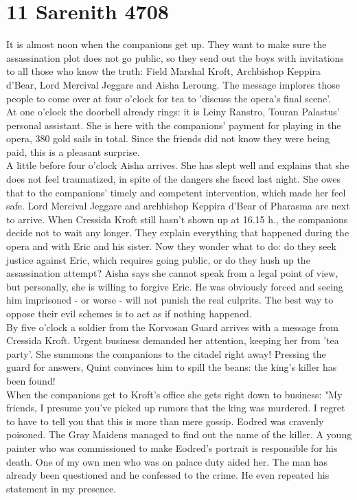 \section{11 Sarenith 4708}

It is almost noon when the companions get up. They want to make sure the assassination plot does not go public, so they send out the boys with invitations to all those who know the truth: Field Marshal Kroft, Archbishop Keppira d'Bear, Lord Mercival Jeggare and Aisha Leroung. The message implores those people to come over at four o'clock for tea to 'discuss the opera's final scene'.\\

At one o'clock the doorbell already rings: it is Leiny Ranstro, Touran Palastus' personal assistant. She is here with the companions' payment for playing in the opera, 380 gold sails in total. Since the friends did not know they were being paid, this is a pleasant surprise.\\

A little before four o'clock Aisha arrives. She has slept well and explains that she does not feel traumatized, in spite of the dangers she faced last night. She owes that to the companions' timely and competent intervention, which made her feel safe. Lord Mercival Jeggare and archbishop Keppira d'Bear of Pharasma are next to arrive. When Cressida Kroft still hasn't shown up at 16.15 h., the companions decide not to wait any longer. They explain everything that happened during the opera and with Eric and his sister. Now they wonder what to do: do they seek justice against Eric, which requires going public, or do they hush up the assassination attempt? Aisha says she cannot speak from a legal point of view, but personally, she is willing to forgive Eric. He was obviously forced and seeing him imprisoned - or worse - will not punish the real culprits. The best way to oppose their evil schemes is to act as if nothing happened.\\

By five o'clock a soldier from the Korvosan Guard arrives with a message from Cressida Kroft. Urgent business demanded her attention, keeping her from 'tea party'. She summons the companions to the citadel right away! Pressing the guard for answers, Quint convinces him to spill the beans: the king's killer has been found!\\

When the companions get to Kroft's office she gets right down to business: "My friends, I presume you've picked up rumors that the king was murdered. I regret to have to tell you that this is more than mere gossip. Eodred was cravenly poisoned. The Gray Maidens managed to find out the name of the killer. A young painter who was commissioned to make Eodred's portrait is responsible for his death. One of my own men who was on palace duty aided her. The man has already been questioned and he confessed to the crime. He even repeated his statement in my presence.\\

